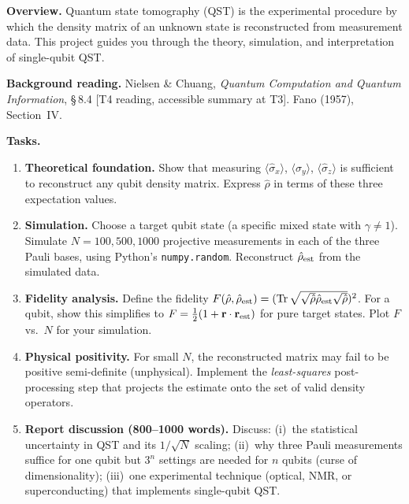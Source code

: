 \documentclass[11pt,a4paper]{article}
\begin{document}
\begin{tcolorbox}[ugprobbox, title={Project CJ1 --- Quantum State Tomography of a Qubit}]

\textbf{Overview.}
Quantum state tomography (QST) is the experimental procedure by which the
density matrix of an unknown state is reconstructed from measurement data.
This project guides you through the theory, simulation, and interpretation
of single-qubit QST.

\medskip\textbf{Background reading.}
Nielsen \& Chuang, \textit{Quantum Computation and Quantum Information}, \S\,8.4 [T4 reading,
accessible summary at T3]. Fano (1957), Section~IV.

\medskip\textbf{Tasks.}
\begin{enumerate}[leftmargin=1.8em, label=\textbf{\arabic*.}, itemsep=8pt]
  \item \textbf{Theoretical foundation.}
        Show that measuring $\langle\hat{\sigma}_x\rangle$,
        $\langle\hat{\sigma}_y\rangle$, $\langle\hat{\sigma}_z\rangle$
        is sufficient to reconstruct any qubit density matrix.
        Express $\hat{\rho}$ in terms of these three expectation values.

  \item \textbf{Simulation.}
        Choose a target qubit state (a specific mixed state with $\gamma\ne 1$).
        Simulate $N=100,500,1000$ projective measurements in each of the three
        Pauli bases, using Python's \texttt{numpy.random}.
        Reconstruct $\hat{\rho}_{\rm est}$ from the simulated data.

  \item \textbf{Fidelity analysis.}
        Define the fidelity $F(\hat{\rho},\hat{\rho}_{\rm est})=(\operatorname{Tr}\sqrt{\sqrt{\hat{\rho}}\hat{\rho}_{\rm est}\sqrt{\hat{\rho}}})^2$.
        For a qubit, show this simplifies to
        $F=\tfrac{1}{2}(1+\mathbf{r}\cdot\mathbf{r}_{\rm est})$
        for pure target states.
        Plot $F$ vs.\ $N$ for your simulation.

  \item \textbf{Physical positivity.}
        For small $N$, the reconstructed matrix may fail to be positive semi-definite
        (unphysical). Implement the \emph{least-squares} post-processing step that
        projects the estimate onto the set of valid density operators.

  \item \textbf{Report discussion (800--1000 words).}
        Discuss: (i)~the statistical uncertainty in QST and its $1/\sqrt{N}$ scaling;
        (ii)~why three Pauli measurements suffice for one qubit but $3^n$ settings
        are needed for $n$ qubits (curse of dimensionality);
        (iii)~one experimental technique (optical, NMR, or superconducting) that
        implements single-qubit QST.
\end{enumerate}


\end{tcolorbox}
\end{document}
